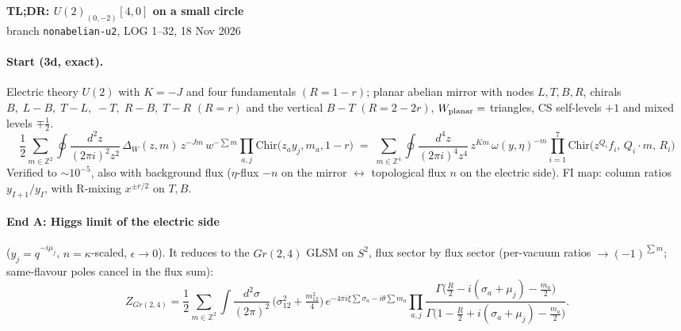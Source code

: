 \documentclass[11pt]{article}
\newcommand{\Chir}{\mathrm{Chir}}
\begin{document}
\begin{center}{\large\bf TL;DR: $U(2)_{(0,-2)}[4,0]$ on a small circle} \\[2pt] {\small branch \texttt{nonabelian-u2}, LOG 1--32, 18 Nov 2026}\end{center}

\paragraph{Start (3d, exact).}
Electric theory $U(2)$ with $K=-J$ and four fundamentals $(R=1-r)$; planar abelian mirror with nodes $L,T,B,R$, chirals
$B,\;L\!-\!B,\;T\!-\!L,\;-T,\;R\!-\!B,\;T\!-\!R$ $(R=r)$ and the vertical $B\!-\!T$ $(R=2-2r)$, $W_{\rm planar}=$ triangles, CS self-levels $+1$ and mixed levels $\mp\tfrac12$.
\begin{equation}
\frac12\sum_{m\in\mathbb Z^2}\oint\!\frac{d^2z}{(2\pi i)^2 z^2}\,
\Delta_W(z,m)\,z^{-Jm}\,w^{-\sum m}\prod_{a,j}\Chir\!\big(z_a y_j,m_a,1-r\big)
\;=\;
\sum_{m\in\mathbb Z^4}\oint\!\frac{d^4z}{(2\pi i)^4 z^4}\,z^{Km}\,\omega(y,\eta)^{-m}\prod_{i=1}^{7}\Chir\!\big(z^{Q_i}f_i,\,Q_i\!\cdot\! m,\,R_i\big)
\label{3d}\end{equation}
Verified to $\sim10^{-5}$, also with background flux ($\eta$-flux $-n$ on the mirror $\leftrightarrow$ topological flux $n$ on the electric side). FI map: column ratios $y_{I+1}/y_I$, with R-mixing $x^{\pm r/2}$ on $T,B$.

\paragraph{End A: Higgs limit of the electric side} ($y_j=q^{-i\mu_j}$, $n=\kappa$-scaled, $\epsilon\to0$). It reduces to the $Gr(2,4)$ GLSM on $S^2$, flux sector by flux sector (per-vacuum ratios $\to(-1)^{\sum m}$; same-flavour poles cancel in the flux sum):
\begin{equation}
Z_{Gr(2,4)}=\frac12\sum_{m\in\mathbb Z^2}\int\!\frac{d^2\sigma}{(2\pi)^2}\,
\Big(\sigma_{12}^2+\tfrac{m_{12}^2}{4}\Big)\,e^{-4\pi i\xi\sum\sigma_a-i\theta\sum m_a}
\prod_{a,j}\frac{\Gamma\!\big(\tfrac{R}{2}-i(\sigma_a+\mu_j)-\tfrac{m_a}{2}\big)}{\Gamma\!\big(1-\tfrac{R}{2}+i(\sigma_a+\mu_j)-\tfrac{m_a}{2}\big)} .
\end{equation}
\end{document}

